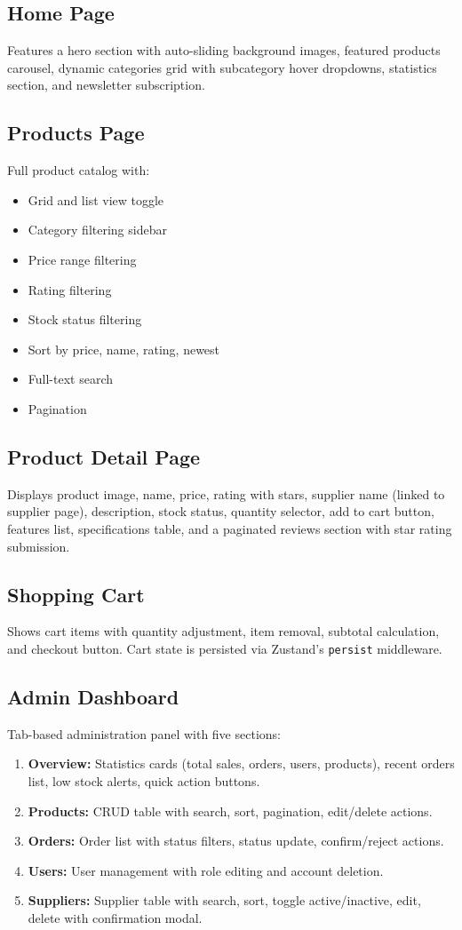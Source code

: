 \documentclass[12pt,a4paper]{report}
\begin{document}
\subsection{Home Page}
Features a hero section with auto-sliding background images, featured products carousel, dynamic categories grid with subcategory hover dropdowns, statistics section, and newsletter subscription.

\subsection{Products Page}
Full product catalog with:
\begin{itemize}[noitemsep]
  \item Grid and list view toggle
  \item Category filtering sidebar
  \item Price range filtering
  \item Rating filtering
  \item Stock status filtering
  \item Sort by price, name, rating, newest
  \item Full-text search
  \item Pagination
\end{itemize}

\subsection{Product Detail Page}
Displays product image, name, price, rating with stars, supplier name (linked to supplier page), description, stock status, quantity selector, add to cart button, features list, specifications table, and a paginated reviews section with star rating submission.

\subsection{Shopping Cart}
Shows cart items with quantity adjustment, item removal, subtotal calculation, and checkout button. Cart state is persisted via Zustand's \texttt{persist} middleware.

\subsection{Admin Dashboard}
Tab-based administration panel with five sections:
\begin{enumerate}[noitemsep]
  \item \textbf{Overview:} Statistics cards (total sales, orders, users, products), recent orders list, low stock alerts, quick action buttons.
  \item \textbf{Products:} CRUD table with search, sort, pagination, edit/delete actions.
  \item \textbf{Orders:} Order list with status filters, status update, confirm/reject actions.
  \item \textbf{Users:} User management with role editing and account deletion.
  \item \textbf{Suppliers:} Supplier table with search, sort, toggle active/inactive, edit, delete with confirmation modal.
\end{enumerate}
\end{document}
